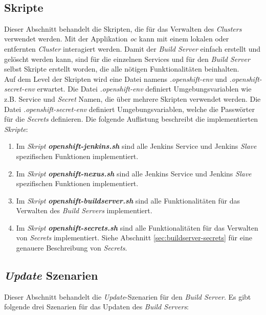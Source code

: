 \ \subsection{Skripte}
\label{sec:buildserver-scripts}
Dieser Abschnitt behandelt die Skripten, die für das Verwalten des \emph{Clusters} verwendet werden. Mit der Applikation \emph{oc} kann mit einem lokalen oder entfernten \emph{Cluster} interagiert werden. Damit der \emph{Build Server} einfach erstellt und gelöscht werden kann, sind für die einzelnen Services und für den \emph{Build Server} selbst
Skripte erstellt worden, die alle nötigen Funktionalitäten beinhalten.\\

Auf dem Level der Skripten wird eine Datei namens \emph{.openshift-env} und \emph{.openshift-secret-env} erwartet. Die Datei \emph{.openshift-env} definiert Umgebungsvariablen wie z.B. Service und \emph{Secret} Namen, die über mehrere Skripten verwendet werden. Die Datei \emph{.openshift-secret-env} definiert Umgebungsvariablen, welche die Passwörter für die \emph{Secrets} definieren. Die folgende Auflistung beschreibt die implementierten \emph{Skripte}:
\begin{enumerate}
	\item Im \emph{Skript} \textbf{\emph{openshift-jenkins.sh}} sind alle Jenkins Service und Jenkins \emph{Slave} spezifischen Funktionen implementiert.
	\item Im \emph{Skript} \textbf{\emph{openshift-nexus.sh}} sind alle Jenkins Service und Jenkins \emph{Slave} spezifischen Funktionen implementiert.
	\item Im \emph{Skript} \textbf{\emph{openshift-buildserver.sh}} sind alle Funktionalitäten für das Verwalten des \emph{Build Servers} implementiert.
	\item Im \emph{Skript} \textbf{\emph{openshift-secrets.sh}} sind alle Funktionalitäten für das Verwalten von \emph{Secrets} implementiert. Siehe Abschnitt \ref{sec:buildserver-secrets} für eine genauere Beschreibung von  \emph{Secrets}.
\end{enumerate}

\subsection{\emph{Update} Szenarien}
\label{sec:buildserver-updates}
Dieser Abschnitt behandelt die \emph{Update}-Szenarien für den \emph{Build Server}. Es gibt folgende drei Szenarien für das Updaten des \emph{Build Servers}:

